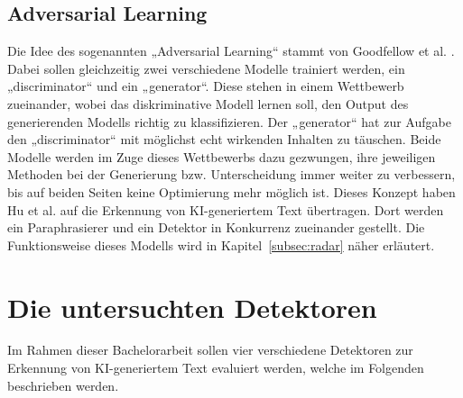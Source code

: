 \subsection{Adversarial Learning}
Die Idee des sogenannten „Adversarial Learning“ stammt von Goodfellow et al. \autocite{goodfellow2014generativeadversarialnetworks}. Dabei sollen gleichzeitig zwei verschiedene Modelle trainiert werden, ein  „discriminator“ und ein „generator“. Diese stehen in einem Wettbewerb zueinander, wobei das diskriminative Modell lernen soll, den Output des generierenden Modells richtig zu klassifizieren. Der „generator“ hat zur Aufgabe den „discriminator“ mit möglichst echt wirkenden Inhalten zu täuschen. Beide Modelle werden im Zuge dieses Wettbewerbs dazu gezwungen, ihre jeweiligen Methoden bei der Generierung bzw. Unterscheidung immer weiter zu verbessern, bis auf beiden Seiten keine Optimierung mehr möglich ist. Dieses Konzept haben Hu et al. \autocite{hu2023radar} auf die Erkennung von KI-generiertem Text übertragen. Dort werden ein Paraphrasierer und ein Detektor in Konkurrenz zueinander gestellt. Die Funktionsweise dieses Modells wird in Kapitel~\ref{subsec:radar} näher erläutert.

\section{Die untersuchten Detektoren}
Im Rahmen dieser Bachelorarbeit sollen vier verschiedene Detektoren zur Erkennung von KI-generiertem Text evaluiert werden, welche im Folgenden beschrieben werden.

